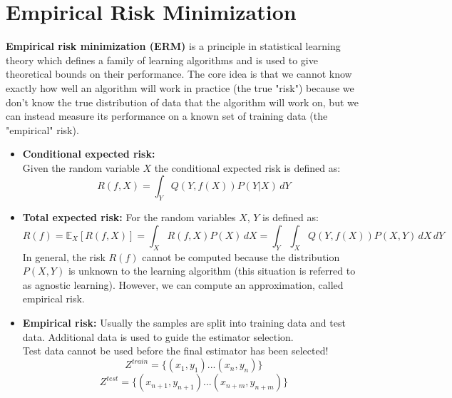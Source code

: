 \documentclass{article}
\begin{document}
\section{Empirical Risk Minimization}
\textbf{Empirical risk minimization (ERM)} is a principle in statistical learning theory which defines a family of learning algorithms and is used to give theoretical bounds on their performance. The core idea is that we cannot know exactly how well an algorithm will work in practice (the true "risk") because we don't know the true distribution of data that the algorithm will work on, but we can instead measure its performance on a known set of training data (the "empirical" risk).
\begin{itemize}
    \item \textbf{Conditional expected risk:}
    \\Given the random variable $X$ the conditional expected risk is defined as:
    \begin{equation*}
        R(f, X) = \int_{Y} Q(Y, f(X))P(Y|X) \,dY
    \end{equation*}
    \item \textbf{Total expected risk:} For the random variables $X$, $Y$ is defined as:
    \begin{equation*}
        R(f) = {\mathbb E_X}[R(f, X)]= \int_{X} R(f, X)P(X) \,dX = \int_{Y}\int_{X} Q(Y, f(X))P(X, Y) \,dX \,dY
    \end{equation*}
    In general, the risk $R(f)$ cannot be computed because the distribution $P(X,Y)$ is unknown to the learning algorithm (this situation is referred to as agnostic learning). However, we can compute an approximation, called empirical risk.
    \item \textbf{Empirical risk:} Usually the samples are split into training data and test data. Additional data is used to guide the estimator selection.
    \\Test data cannot be used before the final estimator has been selected!
    \begin{equation*}
        Z^{train} = \{(x_1,y_1)...(x_n,y_n)\}
    \end{equation*}
    \begin{equation*}
        Z^{test} = \{(x_{n + 1},y_{n + 1})...(x_{n + m},y_{n + m})\}
    \end{equation*}
    
\end{itemize}

\newpage
\end{document}
